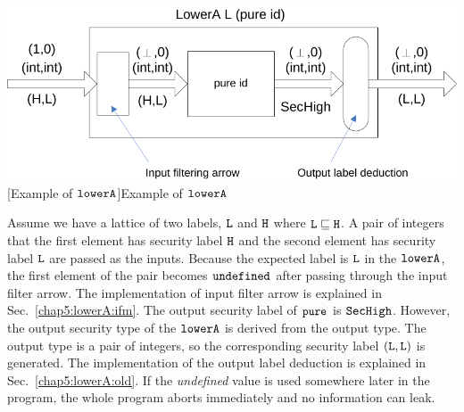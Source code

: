 \documentclass{report}
\newcommand{\co}[1]{$\cod{#1}$}
\begin{document}
\begin{center}
\includegraphics[scale=0.7]{lower.pdf} \\
[Example of \co{lowerA}]{Example of \co{lowerA}}
\end{center}

%
%
Assume we have a lattice of two labels, \co{L} and \co{H} where $\mathtt{L}\sqsubseteq \mathtt{H}$. A pair of 
integers that the first element has security label \co{H} and the second element has security label \co{L} are 
passed as the inputs.
Because the expected label is \co{L} in the \co{lowerA}, the first element of the pair becomes \co{undefined}
after passing through the input filter arrow. The implementation of input filter arrow is explained in
Sec.~\ref{chap5:lowerA:ifm}. The output security label of \co{pure} is \co{SecHigh}. However, the output
security type of the \co{lowerA} is derived from the output type. The output type is a pair of integers, so
the corresponding security label $(\mathtt{L},\mathtt{L})$ is generated. The implementation of the output label
deduction is explained in Sec.~\ref{chap5:lowerA:old}.
If the {\em undefined} value is used somewhere later in the program, the whole program
aborts immediately and no information can leak.
\end{document}
